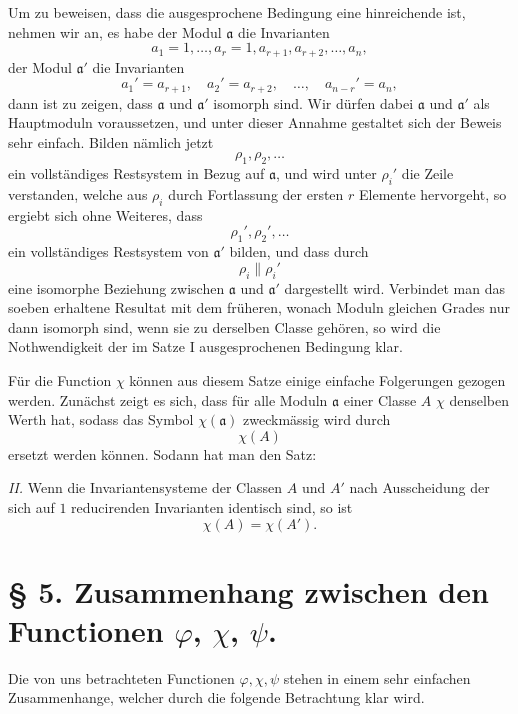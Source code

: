 Um zu beweisen, dass die ausgesprochene Bedingung eine hinreichende ist, nehmen wir an, es habe der Modul $\mathfrak a$ die Invarianten
\[
 a_1=1,\ldots,a_r=1,a_{r+1},a_{r+2},\ldots,a_n,
\]
der Modul $\mathfrak a'$ die Invarianten
\[
 a_1'=a_{r+1},\quad a_2'=a_{r+2},\quad\ldots,\quad a_{n-r}'=a_n,
\]
dann ist zu zeigen, dass $\mathfrak a$ und $\mathfrak a'$ isomorph sind. Wir dürfen dabei $\mathfrak a$ und $\mathfrak a'$ als Hauptmoduln voraussetzen, und unter dieser Annahme gestaltet sich der Beweis sehr einfach. Bilden nämlich jetzt
\[
 \rho_1,\rho_2,\ldots
\]
ein vollständiges Restsystem in Bezug auf $\mathfrak a$, und wird unter $\rho_i'$ die Zeile verstanden, welche aus $\rho_i$ durch Fortlassung der ersten $r$ Elemente hervorgeht, so ergiebt sich ohne Weiteres, dass
\[
 \rho_1',\rho_2',\ldots
\]
ein vollständiges Restsystem von $\mathfrak a'$ bilden, und dass durch
\[
 \rho_i\parallel\rho_i'
\]
eine isomorphe Beziehung zwischen $\mathfrak a$ und $\mathfrak a'$ dargestellt wird. Verbindet man das soeben erhaltene Resultat mit dem früheren, wonach Moduln gleichen Grades nur dann isomorph sind, wenn sie zu derselben Classe gehören, so wird die Nothwendigkeit der im Satze I ausgesprochenen Bedingung klar.

Für die Function $\chi$ können aus diesem Satze einige einfache Folgerungen gezogen werden. Zunächst zeigt es sich, dass für alle Moduln $\mathfrak a$ einer Classe $A$ $\chi$ denselben Werth hat, sodass das Symbol $\chi(\mathfrak a)$ zweckmässig wird durch
\[
 \chi(A)
\]
ersetzt werden können. Sodann hat man den Satz:

\emph{II.} Wenn die Invariantensysteme der Classen $A$ und $A'$ nach Ausscheidung der sich auf $1$ reducirenden Invarianten identisch sind, so ist
\[
 \chi(A)=\chi(A').
\]

\section*{§ 5. Zusammenhang zwischen den Functionen $\varphi$, $\chi$, $\psi$.}

Die von uns betrachteten Functionen $\varphi,\chi,\psi$ stehen in einem sehr einfachen Zusammenhange, welcher durch die folgende Betrachtung klar wird.

